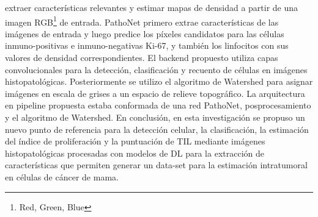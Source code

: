 extraer características relevantes y estimar mapas de densidad a partir de una imagen RGB\footnote{Red, Green, Blue} de entrada. PathoNet primero extrae características de las imágenes de entrada y luego predice los píxeles candidatos para las células inmuno-positivas e inmuno-negativas Ki-67, y también los linfocitos con sus valores de densidad correspondientes. El backend propuesto utiliza capas convolucionales para la detección, clasificación y recuento de células en imágenes histopatológicas. Posteriormente se utilizo el algoritmo de Watershed para asignar imágenes en escala de grises a un espacio de relieve topográfico. La arquitectura en pipeline propuesta estaba conformada de una red PathoNet, posprocesamiento y el algoritmo de Watershed. En conclusión, en esta investigación se propuso un nuevo punto de referencia para la detección celular, la clasificación, la estimación del índice de proliferación y la puntuación de TIL mediante imágenes histopatológicas procesadas con modelos de DL para la extracción de características que permiten generar un data-set para la estimación intratumoral en células de cáncer de mama.